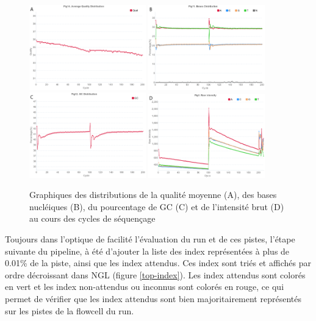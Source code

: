 \begin{figure}[H]
    \centering
    \includegraphics[width=0.45\textwidth]{img/mean_quality.png}
    \includegraphics[width=0.45\textwidth]{img/bases_content.png}\\
    \includegraphics[width=0.45\textwidth]{img/GC_content.png}
    \includegraphics[width=0.45\textwidth]{img/raw_intensity.png}
    \caption{\footnotesize{Graphiques des distributions de la qualité moyenne (A), des bases nucléiques (B), du pourcentage de GC (C) et de l'intensité brut (D) au cours des cycles de séquençage}}
    \label{Graph-rapport-pistes}
\end{figure}

Toujours dans l'optique de facilité l'évaluation du run et de ces pistes, l'étape suivante du pipeline, à été  d'ajouter la liste des index représentées à plus de 0.01\% de la piste, ainsi que les index attendus.
Ces index sont triés et affichés par ordre décroissant dans NGL (figure \ref{top-index}).
Les index attendus sont colorés en vert et les index non-attendus ou inconnus sont colorés en rouge, ce qui permet de vérifier que les index attendus sont bien majoritairement représentés sur les pistes de la flowcell du run.

